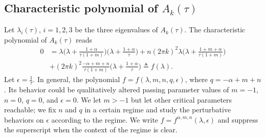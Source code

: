 \documentclass[a4paper,11pt]{article}
\theoremstyle{remark}
\begin{document}
\subsection{Characteristic polynomial of $A_k(\tau)$}
Let $\lambda_i(\tau)$, $i=1,2,3$ be the three eigenvalues of $A_k(\tau)$. %
The characteristic polynomial of $A_k(\tau)$ reads
%
%
%
%
\begin{align}
0&= \lambda\Big(\lambda + \frac{1+\alpha}{\tau(1+m)}\Big)\Big(\lambda + \frac{1+\alpha}{\tau}\Big) + n(2\pi k)^2\lambda\Big(\lambda + \frac{1+m+\alpha}{\tau(1+m)}\Big)\nonumber\\
&+ (2\pi k)^2\frac{-\alpha+m+n}{\tau(1+m)}\Big(\lambda + \frac{1+\alpha}{\tau}\Big)\triangleq f(\lambda). \label{eq:poly}
\end{align}
Let $\epsilon = \frac{1}{\tau}$. In general, the polynomial $f=f(\lambda,m,n,q,\epsilon)$, where $q=-\alpha+m+n$. Its behavior could be qualitatively altered passing parameter values of $m=-1$, $n=0$, $q=0$, and $\epsilon=0$. We  let $m>-1$ but let other critical parameters reachable; we fix $n$ and $q$ in a certain regime and study the perturbative behaviors on $\epsilon$ according to the regime. We write $f= f^{\alpha,m,n}(\lambda,\epsilon)$ and suppress the superscript when the context of the regime is clear.
\end{document}
